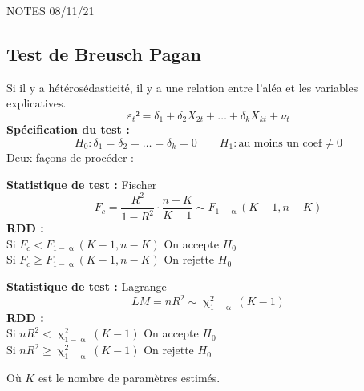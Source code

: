\documentclass{article}
\begin{document}
NOTES 08/11/21 \\
\subsection{Test de Breusch Pagan}
Si il y a hétérosédasticité, il y a une relation entre l'aléa et les variables explicatives. \\
\begin{equation*}
		\varepsilon_{t}² = \delta_{1} + \delta_{2} X_{2t} + \ldots + \delta_{k} X_{kt} + \nu_{t}
\end{equation*}
\textbf{Spécification du test :}
\begin{equation*}
	H_0 : \delta_1 = \delta_2 = \ldots = \delta_k = 0 \qquad H_1 : \text{au moins un coef} \neq 0 
\end{equation*}
Deux façons de procéder :
\begin{multicols}{2}
\textbf{Statistique de test :} Fischer
\begin{equation*}
		F_{c} = \frac{R^2}{1-R^2} \cdot \frac{n-K}{K-1} \sim F_{1-\upalpha}(K-1, n-K)
\end{equation*}
\textbf{RDD :} \\
Si $F_c < F_{1-\upalpha}(K-1, n-K)$ On accepte $H_0$ \\ 
Si $F_c \geq F_{1-\upalpha}(K-1, n-K)$ On rejette $H_0$ \\
\columnbreak

\textbf{Statistique de test :} Lagrange
\begin{equation*}
		LM = n R^2 \sim \upchi^2_{1-\upalpha} (K-1)
\end{equation*}
\textbf{RDD : } \\
Si $nR^2 < \upchi^2_{1-\upalpha} (K-1)$ On accepte $H_0$\\
Si $nR^2 \geq \upchi^2_{1-\upalpha} (K-1)$ On rejette $H_0$ \\ 
\end{multicols}
Où $K$ est le nombre de paramètres estimés.
\end{document}
